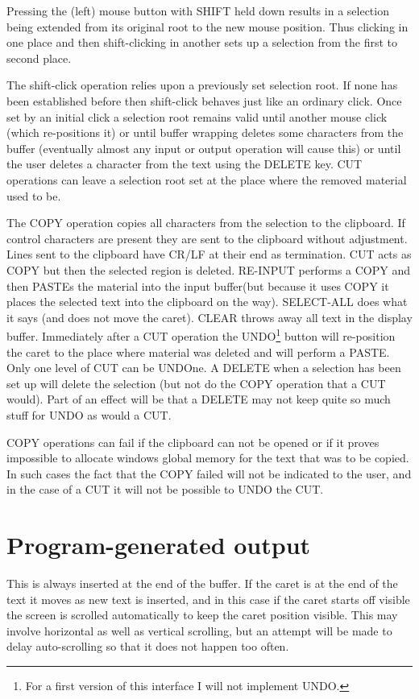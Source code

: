 \documentclass[a4paper,11pt]{article}
\begin{document}
Pressing the (left) mouse button with SHIFT held down results in a selection
being extended from its original root to the new mouse position. Thus
clicking in one place and then shift-clicking in another sets up a selection
from the first to second place.  

The shift-click operation relies upon a previously set selection root. If none
has been established before then shift-click behaves just like an ordinary
click. Once set by an initial click a selection root remains valid until
another mouse click (which re-positions it) or until buffer wrapping deletes
some characters from the buffer (eventually almost any input or output
operation will cause this) or until the user deletes a character from the
text using the DELETE key.  CUT operations can leave a selection root
set at the place where the removed material used to be.

The COPY operation copies all characters from the selection to the clipboard.
If control characters are present they are sent to the clipboard without
adjustment. Lines sent to the clipboard have CR/LF at their end as
termination.  CUT acts as COPY but then the selected region is deleted.
RE-INPUT performs a COPY and then PASTEs the material into the input
buffer(but because it uses COPY it places the selected text into the clipboard
on the way).  SELECT-ALL does what it says (and does not move the caret).
CLEAR throws away all text in the display buffer.  Immediately after a CUT
operation the UNDO\footnote{For a first version of this interface I will
not implement UNDO.} button will re-position the caret to the place where
material was deleted and will perform a PASTE. Only one level of CUT can
be UNDOne.
A DELETE when a selection has been set up will delete the selection (but not
do the COPY operation that a CUT would). Part of an effect will be that
a DELETE may not keep quite so much stuff for UNDO as would a CUT.

COPY operations can fail if the clipboard can not be opened or if it
proves impossible to allocate windows global memory for the text that was to
be copied. In such cases the fact that the COPY failed will not be indicated
to the user, and in the case of a CUT it will not be possible to UNDO the CUT.


\section{Program-generated output}
This is always inserted at the end of the buffer. If the caret is at the end
of the text it moves as new text is inserted, and in this case if the caret
starts off visible the screen is scrolled automatically to keep the caret
position visible. This may involve horizontal as well as vertical scrolling,
but an attempt will be made to delay auto-scrolling so that it does not happen
too often.
\end{document}
